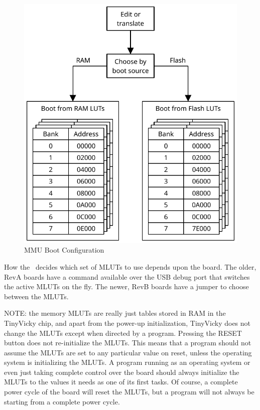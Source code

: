 \begin{figure}[ht]
    \begin{center}
        \includegraphics[scale=0.65]{images/MemoryLUTSelection.pdf}
    \end{center}
    \caption{MMU Boot Configuration}
    \label{fig:lut_choice}
\end{figure}

How the \jr\ decides which set of MLUTs to use depends upon the board. The older, RevA boards have a command available over the USB debug port that switches the active MLUTs on the fly. The newer, RevB boards have a jumper to choose between the MLUTs.

\begin{leftbar}
	NOTE: the memory MLUTs are really just tables stored in RAM in the TinyVicky chip, and apart from the power-up initialization, TinyVicky does not change the MLUTs except when directed by a program. Pressing the RESET button does not re-initialize the MLUTs. This means that a program should not assume the MLUTs are set to any particular value on reset, unless the operating system is initializing the MLUTs. A program running as an operating system or even just taking complete control over the board should always initialize the MLUTs to the values it needs as one of its first tasks. Of course, a complete power cycle of the board will reset the MLUTs, but a program will not always be starting from a complete power cycle.
\end{leftbar}